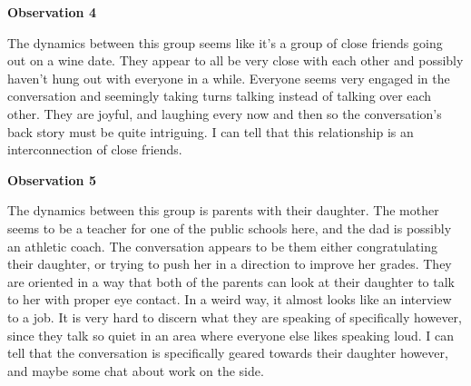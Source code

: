 \documentclass[12pt]{article}
\begin{document}
\par{\textbf{Observation 4}}
\par
The dynamics between this group seems like it's a group of close friends going out on a wine date. They appear to all be very close with each other and possibly haven't hung out with everyone in a while. Everyone seems very engaged in the conversation and seemingly taking turns talking instead of talking over each other. They are joyful, and laughing every now and then so the conversation's back story must be quite intriguing. I can tell that this relationship is an interconnection of close friends.
\par{\textbf{Observation 5}}
\par
The dynamics between this group is parents with their daughter. The mother seems to be a teacher for one of the public schools here, and the dad is possibly an athletic coach. The conversation appears to be them either congratulating their daughter, or trying to push her in a direction to improve her grades. They are oriented in a way that both of the parents can look at their daughter to talk to her with proper eye contact. In a weird way, it almost looks like an interview to a job. It is very hard to discern what they are speaking of specifically however, since they talk so quiet in an area where everyone else likes speaking loud. I can tell that the conversation is specifically geared towards their daughter however, and maybe some chat about work on the side.
\end{document}
